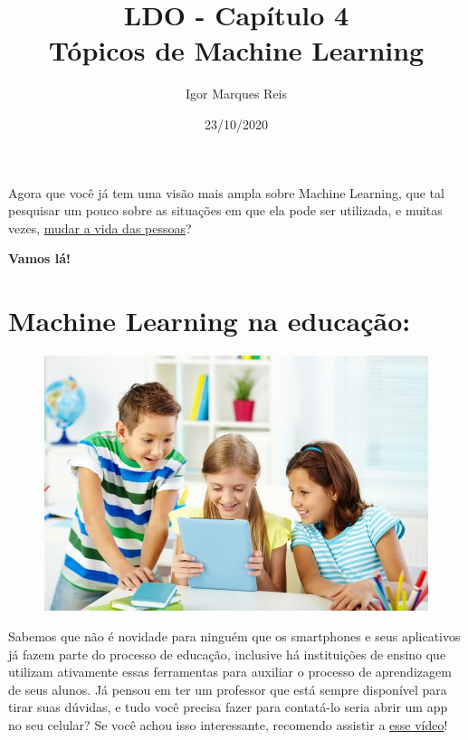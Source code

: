 \documentclass[12pt]{article}
\title{\textbf{LDO - Capítulo 4\\
Tópicos de Machine Learning}}
\author{Igor Marques Reis}
\date{23/10/2020}
\begin{document}
    \maketitle

    \centering Agora que você já tem uma visão mais ampla sobre Machine Learning,
que tal pesquisar um pouco sobre as situações em que ela pode ser
utilizada, e muitas vezes, \href{https://www.deal.com.br/blog/7-maneiras-de-como-a-inteligencia-artificial-esta-mudando-nosso-dia-a-dia/}{mudar a vida das pessoas}?


    \centering \large\textbf{Vamos lá!}
    
            \section*{\centering Machine Learning na educação:}\label{sec:ML_Na_Educacao}
            
            \begin{figure}[ht]
            \centering
            \includegraphics[scale=0.4]{ldo-1.jpg}               
            \end{figure}
            
    Sabemos que não é novidade para ninguém que os smartphones e seus aplicativos já
fazem parte do processo de educação, inclusive há instituições de ensino que utilizam ativamente
essas ferramentas para auxiliar o processo de aprendizagem de seus alunos.
Já pensou em ter um professor que está sempre disponível para tirar
suas dúvidas, e tudo você precisa fazer para contatá-lo seria abrir um
app no seu celular? Se você achou isso interessante, recomendo
assistir a \href{https://www.youtube.com/watch?v=Gjm1xgJVij4}{esse vídeo}!\\
\end{document}
